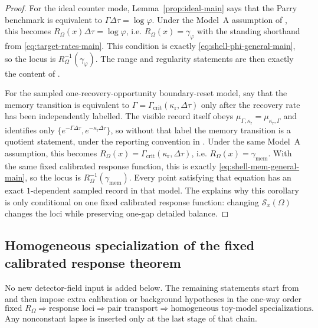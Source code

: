 \begin{proof}
For the ideal counter mode, Lemma~\ref{prop:ideal-main} says that the
Parry benchmark is equivalent to $\Gamma\Delta\tau=\log\varphi$. Under the
Model~A assumption of , this becomes
$R_\Omega(x)\Delta\tau=\log\varphi$, i.e. $R_\Omega(x)=\gamma_\varphi$ with
the standing shorthand from \eqref{eq:target-rates-main}. This condition is
exactly \eqref{eq:shell-phi-general-main}, so the locus is
$R_\Omega^{-1}(\gamma_\varphi)$. The range and regularity statements are then
exactly the content of .

For the sampled one-recovery-opportunity boundary-reset model,
 say that the memory
transition is equivalent to $\Gamma=\Gamma_{\mathrm{crit}}(\kappa_{\mathrm r},\Delta\tau)$
only after the recovery rate has been independently labelled.  The visible
record itself obeys
\(\mu_{\Gamma,\kappa_{\mathrm r}}=\mu_{\kappa_{\mathrm r},\Gamma}\) and
identifies only
\(\{e^{-\Gamma\Delta\tau},e^{-\kappa_{\mathrm r}\Delta\tau}\}\), so without
that label the memory transition is a quotient statement, under the reporting
convention in .
Under the same Model~A assumption, this becomes
$R_\Omega(x)=\Gamma_{\mathrm{crit}}(\kappa_{\mathrm r},\Delta\tau)$, i.e.
$R_\Omega(x)=\gamma_{\mathrm{mem}}$. With the same fixed calibrated response
function, this is exactly \eqref{eq:shell-mem-general-main}, so the locus is
$R_\Omega^{-1}(\gamma_{\mathrm{mem}})$. Every point satisfying that equation
has an exact $1$-dependent sampled record in that model. The
 explains why this corollary is
only conditional on one fixed calibrated response function: changing
$\mathcal S_x(\Omega)$ changes the loci while preserving one-gap detailed
balance.
\end{proof}

\subsection{Homogeneous specialization of the fixed calibrated response theorem}

No new detector-field input is added below. The remaining statements start from
 and then impose extra
calibration or background hypotheses in the one-way order
\[
\text{fixed }R_\Omega
\Longrightarrow
\text{response loci}
\Longrightarrow
\text{pair transport}
\Longrightarrow
\text{homogeneous toy-model specializations}.
\]
Any nonconstant lapse is inserted only at the last stage of that chain.

